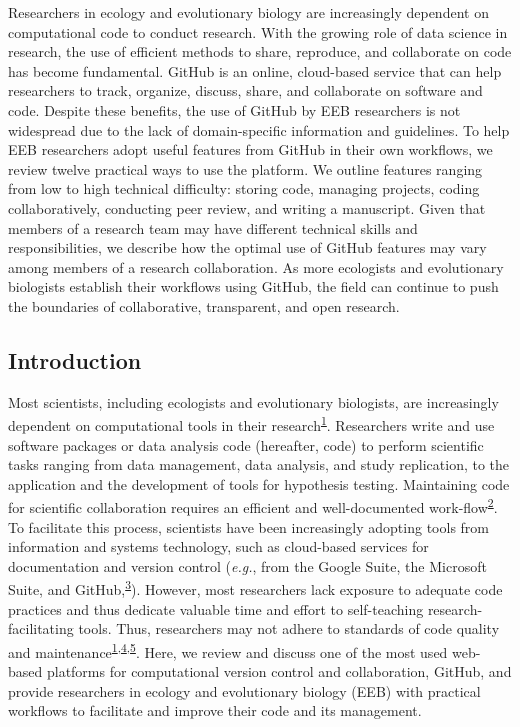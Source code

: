 Researchers in ecology and evolutionary biology are increasingly dependent on computational code to conduct research.
With the growing role of data science in research, the use of efficient methods to share, reproduce, and collaborate on code has become fundamental.
GitHub is an online, cloud-based service that can help researchers to track, organize, discuss, share, and collaborate on software and code.
Despite these benefits, the use of GitHub by EEB researchers is not widespread due to the lack of domain-specific information and guidelines.
To help EEB researchers adopt useful features from GitHub in their own workflows, we review twelve practical ways to use the platform.
We outline features ranging from low to high technical difficulty: storing code, managing projects, coding collaboratively, conducting peer review, and writing a manuscript.
Given that members of a research team may have different technical skills and responsibilities, we describe how the optimal use of GitHub features may vary among members of a research collaboration.
As more ecologists and evolutionary biologists establish their workflows using GitHub, the field can continue to push the boundaries of collaborative, transparent, and open research.

\hypertarget{introduction}{%
\subsection{Introduction}\label{introduction}}

Most scientists, including ecologists and evolutionary biologists, are increasingly dependent on computational tools in their research\textsuperscript{\protect\hyperlink{ref-fJWFe93e}{1}}.
Researchers write and use software packages or data analysis code (hereafter, code) to perform scientific tasks ranging from data management, data analysis, and study replication, to the application and the development of tools for hypothesis testing.
Maintaining code for scientific collaboration requires an efficient and well-documented work-flow\textsuperscript{\protect\hyperlink{ref-1Kqna6l2}{2}}.
To facilitate this process, scientists have been increasingly adopting tools from information and systems technology, such as cloud-based services for documentation and version control (\emph{e.g.}, from the Google Suite, the Microsoft Suite, and GitHub,\textsuperscript{\protect\hyperlink{ref-10ghgV3S8}{3}}).
However, most researchers lack exposure to adequate code practices and thus dedicate valuable time and effort to self-teaching research-facilitating tools.
Thus, researchers may not adhere to standards of code quality and maintenance\textsuperscript{\protect\hyperlink{ref-fJWFe93e}{1},\protect\hyperlink{ref-10SpoByIw}{4},\protect\hyperlink{ref-O6UbstGG}{5}}.
Here, we review and discuss one of the most used web-based platforms for computational version control and collaboration, GitHub, and provide researchers in ecology and evolutionary biology (EEB) with practical workflows to facilitate and improve their code and its management.

